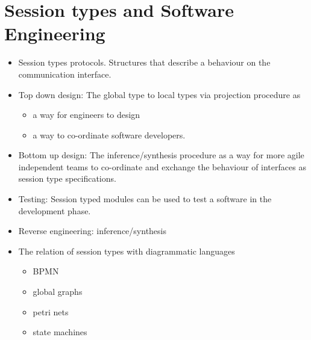 \section{Session types and Software Engineering}

\begin{itemize}
	\item	Session types protocols. Structures that describe
			a behaviour on the communication interface.

	\item	Top down design: The global type to local types via projection procedure as
			\begin{itemize}
				\item	a way for engineers to design
				\item	a way to co-ordinate software developers.
			\end{itemize}

	\item	Bottom up design: The inference/synthesis procedure as
			a way for more agile independent teams to co-ordinate and
			exchange the behaviour of interfaces as session type
			specifications.

	\item	Testing: Session typed modules can be used to test
			a software in the development phase.

	\item	Reverse engineering: inference/synthesis

	\item	The relation of session types with diagrammatic languages
			\begin{itemize}
				\item	BPMN \cite{citation_needed}
				\item	global graphs\cite{citation_needed}
				\item	petri nets\cite{citation_needed}
				\item	state machines \cite{citation_needed}
			\end{itemize}
\end{itemize}
